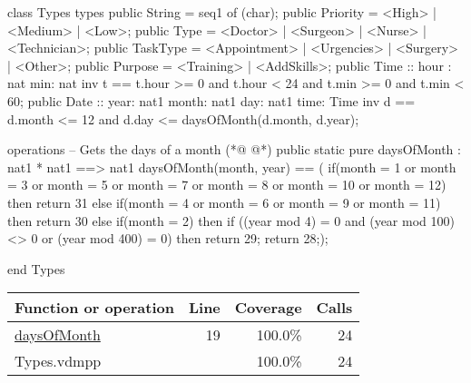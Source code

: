 \begin{vdmpp}[breaklines=true]
class Types
types
 public String = seq1 of (char);
 public Priority = <High> | <Medium> | <Low>;
 public Type = <Doctor> | <Surgeon> | <Nurse> | <Technician>;
 public TaskType = <Appointment> | <Urgencies> | <Surgery> | <Other>;
 public Purpose = <Training> | <AddSkills>;
 public Time :: hour : nat
         min: nat
 inv t == t.hour >= 0 and t.hour < 24 and t.min >= 0 and t.min < 60;
 public Date ::  year: nat1
         month: nat1
         day: nat1
         time: Time
 inv d == d.month <= 12 and d.day <= daysOfMonth(d.month, d.year);
 
operations
 -- Gets the days of a month
(*@
\label{daysOfMonth:19}
@*)
 public static pure daysOfMonth : nat1 * nat1 ==> nat1
  daysOfMonth(month, year) == (
              if(month = 1 or month = 3 or month = 5 or month = 7 or month = 8 or month = 10 or month = 12)
               then return 31
              else if(month = 4 or month = 6 or month = 9 or month = 11)
               then return 30
              else if(month = 2)
               then if ((year mod 4) = 0 and (year mod 100) <> 0 or (year mod 400) = 0)
                then return 29;
              return 28;);
                
end Types
\end{vdmpp}
\bigskip
\begin{longtable}{|l|r|r|r|}
\hline
Function or operation & Line & Coverage & Calls \\
\hline
\hline
\hyperref[daysOfMonth:19]{daysOfMonth} & 19&100.0\% & 24 \\
\hline
\hline
Types.vdmpp & & 100.0\% & 24 \\
\hline
\end{longtable}


